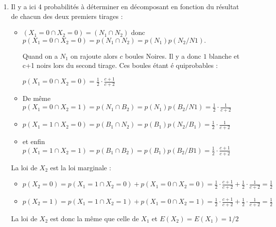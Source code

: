\begin{correction}
\begin{enumerate}
\item Il y a ici 4 probabilit\'{e}s \`{a} d\'{e}terminer en d\'{e}composant
en fonction du r\'{e}sultat de chacun des deux premiers tirages :

\begin{itemize}
\item $\left( X_{1}=0\cap X_{2}=0\right) =\left( N_{1}\cap N_{2}\right) $
donc $p\left( X_{1}=0\cap X_{2}=0\right) =p\left( N_{1}\cap N_{2}\right)
=p\left( N_{1}\right) p\left( N_{2}/N1\right) .$

Quand on a $N_{1}$ on rajoute alors $c$ boules Noires. Il y a donc $1$
blanche et c+1 noirs lors du second tirage. Ces boules \'{e}tant \'{e}%
quiprobables :

$p\left( X_{1}=0\cap X_{2}=0\right) =\displaystyle
\frac{1}{2}\cdot \frac{c+1}{c+2}$

\item De m\^{e}me $p\left( X_{1}=0\cap X_{2}=1\right) =p\left( N_{1}\cap
B_{2}\right) =p\left( N_{1}\right) p\left( B_{2}/N1\right) =\displaystyle
\frac{1}{2}\cdot \frac{1}{c+2}$

\item $p\left( X_{1}=1\cap X_{2}=0\right) =p\left( B_{1}\cap N_{2}\right)
=p\left( B_{1}\right) p\left( N_{2}/B_{1}\right) =\displaystyle
\frac{1}{2}\cdot \frac{1}{c+2}$

\item et enfin $p\left( X_{1}=1\cap X_{2}=1\right) =p\left( B_{1}\cap
B_{2}\right) =p\left( B_{1}\right) p\left( B_{2}/B1\right) =\displaystyle
\frac{1}{2}\cdot \frac{c+1}{c+2}$
\end{itemize}

La loi de $X_{2}$ est la loi marginale :

\begin{itemize}
\item $p\left( X_{2}=0\right) =p\left( X_{1}=1\cap X_{2}=0\right) +p\left(
X_{1}=0\cap X_{2}=0\right) =\displaystyle
\frac{1}{2}\cdot \frac{c+1}{c+2}+\frac{1}{2}\cdot \frac{1}{c+2}=\frac{1}{2}$

\item $p\left( X_{2}=1\right) =p\left( X_{1}=1\cap X_{2}=1\right) +p\left(
X_{1}=0\cap X_{2}=1\right) =\displaystyle
\frac{1}{2}\cdot \frac{c+1}{c+2}+\frac{1}{2}\cdot \frac{1}{c+2}=\frac{1}{2}$
\end{itemize}

La loi de $X_{2}$ est donc la m\^{e}me que celle de $X_{1}$ et $E\left(
X_{2}\right) =E\left( X_{1}\right) =1/2$


\end{enumerate}
\end{correction}
